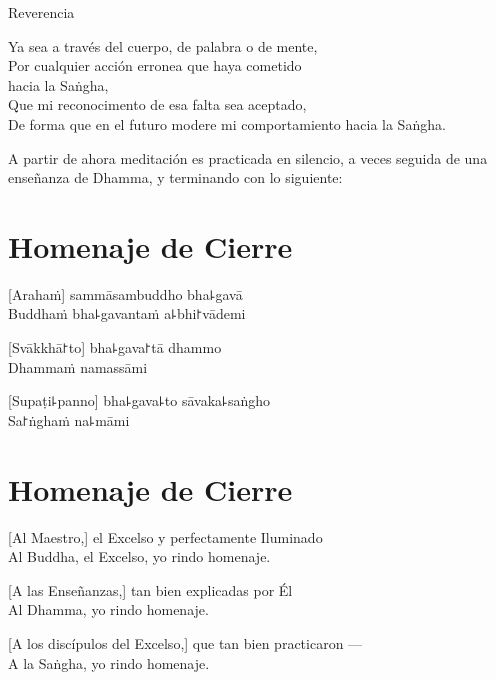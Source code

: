 \enlargethispage{2\baselineskip}

\vfill

\begin{instruction}
  Reverencia
\end{instruction}

Ya sea a través del cuerpo, de palabra o de mente,\\
Por cualquier acción erronea que haya cometido\\
\vin hacia la Saṅgha,\\
Que mi reconocimento de esa falta sea aceptado,\\
De forma que en el futuro modere mi comportamiento hacia la Saṅgha.

\begin{instruction}
  A partir de ahora meditación es practicada en silencio, a veces seguida de una enseñanza de Dhamma, y terminando con lo siguiente:
\end{instruction}

\clearpage

\chapter*{Homenaje de Cierre}

\delegateSetUseNext

[Arahaṁ] sammāsambuddho bha꜕gavā\\
Buddhaṁ bha꜕gavantaṁ a꜕bhi꜓vādemi 

[Svākkhā꜓to] bha꜕gava꜓tā dhammo\\
Dhammaṁ namassāmi 

[Supaṭi꜕panno] bha꜕gava꜕to sāvaka꜕saṅgho\\
Sa꜓ṅghaṁ na꜕māmi 

\clearpage

\chapter{Homenaje de Cierre}

[Al Maestro,] el Excelso y perfectamente Iluminado \\
Al Buddha, el Excelso, yo rindo homenaje. 

[A las Enseñanzas,] tan bien explicadas por Él \\
Al Dhamma, yo rindo homenaje. 

[A los discípulos del Excelso,] que tan bien practicaron ---\\
A la Saṅgha, yo rindo homenaje. 

